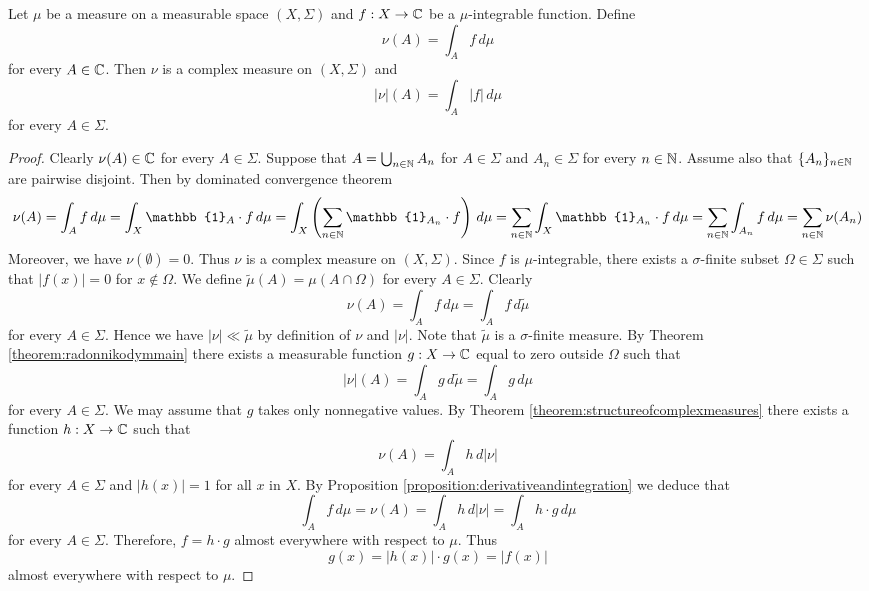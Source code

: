\begin{corollary}\label{corollary:totalvariationofcontinuousmeasure}
    Let $\mu$ be a measure on a measurable space $(X,\Sigma)$ and $f:X\rightarrow {\mathbb C}$ be a $\mu$-integrable function. Define
    $$\nu(A) = \int_Af\,d\mu$$
    for every $A\in {\mathbb C}$. Then $\nu$ is a complex measure on $(X,\Sigma)$ and
    $$|\nu|(A) = \int_A|f|\,d\mu$$
    for every $A\in \Sigma$.
\end{corollary}
\begin{proof}
    Clearly $\nu(A)\in {\mathbb C}$ for every $A\in \Sigma$. Suppose that $A = \bigcup_{n\in {\mathbb N}}A_n$ for $A\in \Sigma$ and $A_n\in \Sigma$ for every $n\in {\mathbb N}$. Assume also that $\{A_n\}_{n\in {\mathbb N}}$ are pairwise disjoint. Then by dominated convergence theorem
    $$\nu(A) = \int_A f\,d\mu = \int_X\mathbb{1}_A\cdot f\,d\mu = \int_X\left(\sum_{n\in \NN}\mathbb{1}_{A_n}\cdot f\right)\,d\mu = \sum_{n\in \NN}\int_X\mathbb{1}_{A_n}\cdot f\,d\mu = \sum_{n\in \NN}\int_{A_n}f\,d\mu = \sum_{n\in \NN}\nu(A_n)$$
    Moreover, we have $\nu(\emptyset) = 0$. Thus $\nu$ is a complex measure on $(X,\Sigma)$. Since $f$ is $\mu$-integrable, there exists a $\sigma$-finite subset $\Omega\in \Sigma$ such that $|f(x)|= 0$ for $x\not \in \Omega$. We define $\tilde{\mu}(A) = \mu(A\cap \Omega)$ for every $A\in \Sigma$. Clearly
    $$\nu(A) = \int_Af\,d\mu = \int_Af\,d\tilde{\mu}$$
    for every $A\in \Sigma$. Hence we have $|\nu|\ll\tilde{\mu}$ by definition of $\nu$ and $|\nu|$. Note that $\tilde{\mu}$ is a $\sigma$-finite measure. By Theorem \ref{theorem:radonnikodymmain} there exists a measurable function $g:X\rightarrow {\mathbb C}$ equal to zero outside $\Omega$ such that
    $$|\nu|(A) = \int_Ag\,d\tilde{\mu} = \int_Ag\,d\mu$$
    for every $A\in \Sigma$. We may assume that $g$ takes only nonnegative values. By Theorem \ref{theorem:structureofcomplexmeasures} there exists a function $h:X\rightarrow {\mathbb C}$ such that
    $$\nu(A) = \int_Ah\,d|\nu|$$
    for every $A\in \Sigma$ and $|h(x)|=1$ for all $x$ in $X$. By Proposition \ref{proposition:derivativeandintegration} we deduce that
    $$\int_Af\,d\mu = \nu(A) = \int_Ah\,d|\nu| = \int_Ah\cdot g\,d\mu$$
    for every $A\in \Sigma$. Therefore, $f = h\cdot g$ almost everywhere with respect to $\mu$. Thus
    $$g(x) = |h(x)|\cdot g(x) = |f(x)|$$
    almost everywhere with respect to $\mu$.
\end{proof}


